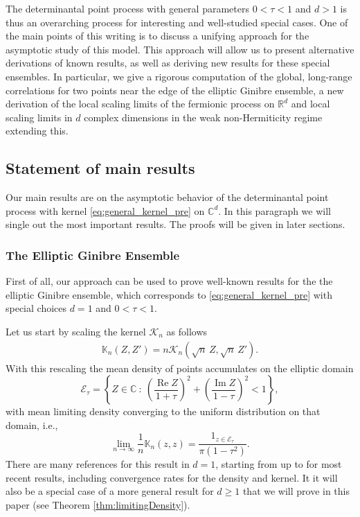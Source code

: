 \documentclass[%
 jmp,
cp,  %
 amsmath,amsthm,amssymb,%
 reprint,%
onecolumn]{revtex4-2}
\renewcommand{\Re}{\operatorname{Re}}
\renewcommand{\Im}{\operatorname{Im}}
\begin{document}
The determinantal point process with general parameters $0<\tau < 1$ and $d>1$ is thus an overarching process for interesting and well-studied special cases. One of the main points of this writing is to discuss a unifying approach for the asymptotic study of this model. This approach will allow us to present alternative derivations of known results, as well as deriving new results for these special ensembles.  In particular, we give a rigorous computation of the 
global, long-range correlations for two points near the edge  of the elliptic Ginibre ensemble, a new derivation of the local scaling limits of the fermionic process on $\mathbb{R}^d$ and  local scaling limits in $d$ complex dimensions in the weak non-Hermiticity regime extending this.

\subsection{Statement of main results}

Our main results are on the asymptotic behavior of the determinantal point process with kernel \eqref{eq:general_kernel_pre} on $\mathbb C^d$. In this paragraph we will single out the most important results. The proofs will be given in later sections.


 \subsubsection{The Elliptic Ginibre Ensemble}
First of all, our approach can be used to prove well-known results for the  the elliptic Ginibre ensemble, which corresponds to \eqref{eq:general_kernel_pre} with special choices $d=1$ and $0<\tau <1$. 

Let us start by  scaling   the  kernel $\mathcal K_n$ as follows
\begin{align} \label{eq:general_kernel_d=1}
    \mathbb K_n(Z,Z')= n \mathcal K_n\left(\sqrt n\, Z, \sqrt n\, Z' \right).
\end{align}
With this rescaling  the mean density of points accumulates on the elliptic domain
$$
    \mathcal E_\tau=
        \left\{
            Z \in \mathbb C \ : \ \left(\frac{\Re Z}{1+\tau}\right)^2+\left(\frac{\Im Z}{1-\tau}\right)^2<1
        \right\},
$$
with mean limiting density converging to the uniform distribution on that domain, i.e., 
$$\lim_{n \to \infty} \frac{1}{n} \mathbb K_n(z,z)=\frac{\mathfrak{1}_{z \in \mathcal E_\tau } }{\pi (1-\tau^2)}.
$$
There are many references for this result in $d=1$, starting from \cite{Girko,SCSS} up to \cite{LeRi} for most recent results, including convergence rates for the density and kernel. It it will also be a special case of a more general result for $d\geq 1$ that we will prove in this paper (see Theorem \ref{thm:limitingDensity}).
\end{document}
